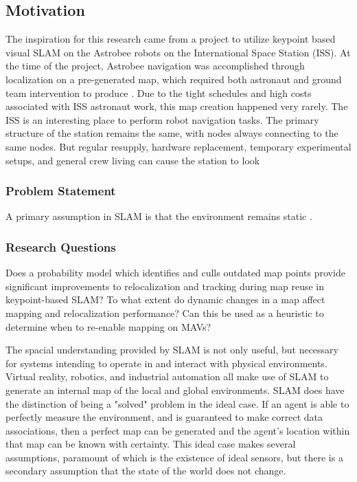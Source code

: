 \subsection{Motivation}

The inspiration for this research came from a project to utilize keypoint based visual SLAM on the Astrobee robots on the International Space Station (ISS). At the time of the project, Astrobee navigation was accomplished through localization on a pre-generated map, which required both astronaut and ground team intervention to produce \cite{Astroloc}. Due to the tight schedules and high costs associated with ISS astronaut work, this map creation happened very rarely. The ISS is an interesting place to perform robot navigation tasks. The primary structure of the station remains the same, with nodes always connecting to the same nodes. But regular resupply, hardware replacement, temporary experimental setups, and general crew living can cause the station to look 

\subsubsection{Problem Statement}

A primary assumption in SLAM is that the environment remains static \cite{static environment slam}.

\subsubsection{Research Questions}

Does a probability model which identifies and culls outdated map points provide significant improvements to relocalization and tracking during map reuse in keypoint-based SLAM?
To what extent do dynamic changes in a map affect mapping and relocalization performance?
Can this be used as a heuristic to determine when to re-enable mapping on MAVs?

The spacial understanding provided by SLAM is not only useful, but necessary for systems intending to operate in and interact with physical environments. Virtual reality, robotics, and industrial automation all make use of SLAM to generate an internal map of the local and global environments. SLAM does have the distinction of being a "solved" problem in the ideal case. If an agent is able to perfectly measure the environment, and is guaranteed to make correct data associations, then a perfect map can be generated and the agent's location within that map can be known with certainty. This ideal case makes several assumptions, paramount of which is the existence of ideal sensors, but there is a secondary assumption that the state of the world does not change.

